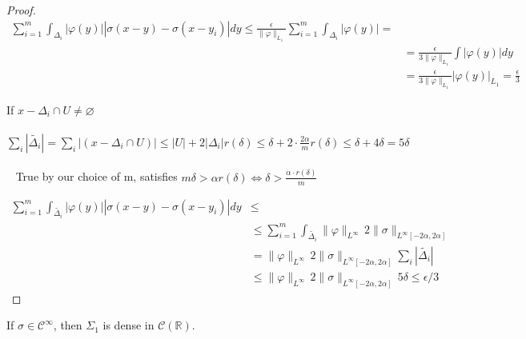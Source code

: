 \documentclass[../main.tex]{subfiles}
\begin{document}
\begin{proof}
		
		\begin{equation*}
			\begin{split}
				\sum_{i=1}^m  \int_{\Delta_i} \left| \varphi(y)\right| \left| \sigma(x-y)-\sigma(x-y_i)\right|dy  \leq  \frac{\epsilon}{\| \varphi\|_{L_1}}  \sum_{i=1}^m  \int_{\Delta_i} \left| \varphi(y)\right| = & \\
				& =  \frac{\epsilon}{3\| \varphi\|_{L_1}} \int \left|\varphi(y)\right| dy \\
				& =  \frac{\epsilon}{3\| \varphi\|_{L_1}} \left|\varphi(y)\right|_{L_1} = \frac{\epsilon}{3} 
			\end{split}
		\end{equation*}
		
		If $x-\Delta_i \cap U \neq \varnothing$\\ \\ 
		$\sum_i |\tilde{\Delta_i}| = \sum_i|(x-\Delta_i \cap U)| \leq |U|+2|\Delta_i| r(\delta) \leq \delta + 2 \cdot \frac{2\alpha}{m} r(\delta) \leq \delta +4\delta = 5\delta$  \\ \\ 
		True by our choice of m, satisfies $m\delta > \alpha r(\delta) \iff \delta > \frac{\alpha \cdot r(\delta)}{m}$
		
		
		\begin{equation*}
			\begin{split}
				\sum_{i=1}^m  \int_{\tilde{\Delta_i}} \left| \varphi(y)\right| \left| \sigma(x-y)-\sigma(x-y_i)\right|dy & \leq \\
				&  \leq  \sum_{i=1}^m  \int_{\tilde{\Delta_i}} \| \varphi\|_{L^{\infty}} \, 2 \| \sigma \|_{L^{\infty}[-2\alpha,2\alpha]} \\
				& = \| \varphi\|_{L^{\infty}} \, 2 \| \sigma \|_{L^{\infty}[-2\alpha,2\alpha]} \sum_i| \tilde{\Delta_i} | \\
				& \leq \| \varphi\|_{L^{\infty}} \, 2 \| \sigma \|_{L^{\infty}[-2\alpha,2\alpha]} \, 5 \delta \leq \epsilon /3
			\end{split}
		\end{equation*}
		
	\end{proof}
	
	\begin{lema} %
		If $\sigma \in \mathcal{C}^{\infty}$, then $ \Sigma_1$ is dense in  $\mathcal{C}(\mathbb{R})$.
	\end{lema}
	
\end{document}

